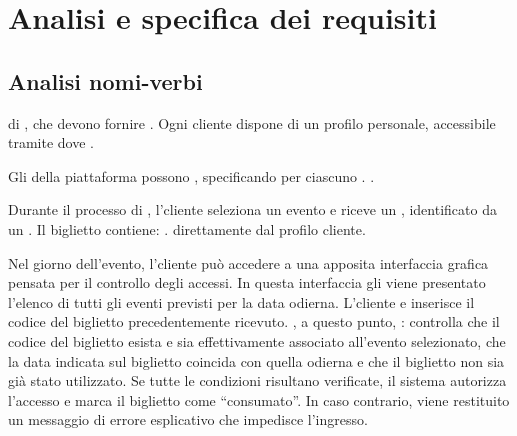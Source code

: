 
\chapter{Analisi e specifica dei requisiti}
\section{Analisi nomi-verbi}


 di , che devono fornire . Ogni cliente dispone di un profilo personale, accessibile tramite  dove .

Gli  della piattaforma possono , specificando per ciascuno .   .

Durante il processo di , l’cliente seleziona un evento e riceve un , identificato da un . Il biglietto contiene: .  direttamente dal profilo cliente.

Nel giorno dell’evento, l’cliente pu\`{o} accedere a una apposita interfaccia grafica pensata per il controllo degli accessi. In questa interfaccia gli viene presentato l’elenco di tutti gli eventi previsti per la data odierna. L’cliente  e inserisce il codice del biglietto precedentemente ricevuto. , a questo punto, : controlla che il codice del biglietto esista e sia effettivamente associato all’evento selezionato, che la data indicata sul biglietto coincida con quella odierna e che il biglietto non sia gi\`{a} stato utilizzato. Se tutte le condizioni risultano verificate, il sistema autorizza l’accesso e marca il biglietto come “consumato”. In caso contrario, viene restituito un messaggio di errore esplicativo che impedisce l’ingresso.

